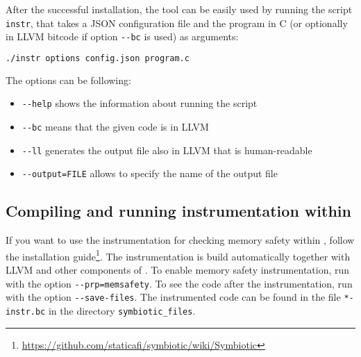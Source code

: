 \noindent After the successful installation, the tool can be easily used by
running the script \texttt{instr}, that takes a JSON configuration file and the
program in C (or optionally in LLVM bitcode if option \texttt{-{}-bc} is used)
as arguments:

\begin{lstlisting}[language=bash]
./instr options config.json program.c
\end{lstlisting}

\newpage
\noindent The options can be following:
\begin{itemize}
  \item \texttt{-{}-help} shows the information about running the script
  \item \texttt{-{}-bc} means that the given code is in LLVM
  \item \texttt{-{}-ll} generates the output file also in LLVM that is human-readable
  \item \texttt{-{}-output=FILE} allows to specify the name of the output file
\end{itemize}

\subsection{Compiling and running instrumentation within \symbiotic}

If you want to use the instrumentation for checking memory safety within
\symbiotic, follow the \symbiotic installation
guide\footnote{\url{https://github.com/staticafi/symbiotic/wiki/Symbiotic}}.
The instrumentation is build automatically together with LLVM and other
components of \symbiotic. To enable memory safety instrumentation, run
\symbiotic with the option \texttt{-{}-prp=memsafety}. To see the code after
the instrumentation, run \symbiotic with the option \texttt{-{}-save-files}.
The instrumented code can be found in the file \texttt{*-instr.bc}
in the directory \texttt{symbiotic\_files}.

